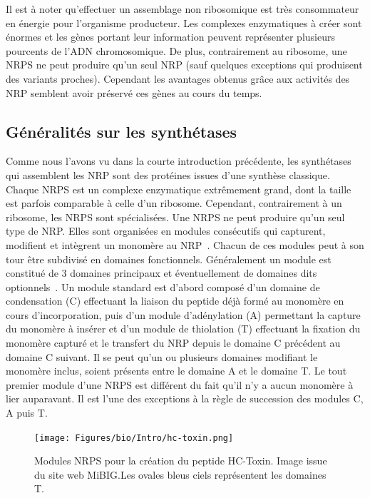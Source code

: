 Il est à noter qu'effectuer un assemblage non ribosomique est très consommateur en énergie pour l'organisme producteur.
Les complexes enzymatiques à créer sont énormes et les gènes portant leur information peuvent représenter plusieurs pourcents de l'ADN chromosomique.
De plus, contrairement au ribosome, une NRPS ne peut produire qu'un seul NRP (sauf quelques exceptions qui produisent des variants proches).
Cependant les avantages obtenus grâce aux activités des NRP semblent avoir préservé ces gènes au cours du temps.


\subsection{Généralités sur les synthétases}

Comme nous l'avons vu dans la courte introduction précédente, les synthétases qui assemblent les NRP sont des protéines issues d'une synthèse classique.
Chaque NRPS est un complexe enzymatique extrêmement grand, dont la taille est parfois comparable à celle d'un ribosome.
Cependant, contrairement à un ribosome, les NRPS sont spécialisées.
Une NRPS ne peut produire qu'un seul type de NRP.
Elles sont organisées en modules consécutifs qui capturent, modifient et intègrent un monomère au NRP~\cite{schwarzer_nonribosomal_2003,marahiel_modular_1997}.
Chacun de ces modules peut à son tour être subdivisé en domaines fonctionnels.
Généralement un module est constitué de 3 domaines principaux et éventuellement de domaines dits optionnels~\cite{finking_biosynthesis_2004}.
Un module standard est d'abord composé d'un domaine de condensation (C) effectuant la liaison du peptide déjà formé au monomère en cours d'incorporation, puis d'un module d'adénylation (A) permettant la capture du monomère à insérer et d'un module de thiolation (T) effectuant la fixation du monomère capturé et le transfert du NRP depuis le domaine C précédent au domaine C suivant.
Il se peut qu'un ou plusieurs domaines modifiant le monomère inclus, soient présents entre le domaine A et le domaine T.
Le tout premier module d'une NRPS est différent du fait qu'il n'y a aucun monomère à lier auparavant.
Il est l'une des exceptions à la règle de succession des modules C, A puis T.

\begin{figure}[h!]
  \begin{center}
    \texttt{[image: Figures/bio/Intro/hc-toxin.png]}
    \caption{\label{mibig_hc}Modules NRPS pour la création du peptide HC-Toxin.
    Image issue du site web MiBIG.Les ovales bleus ciels représentent les domaines T.}
  \end{center}
\end{figure}

